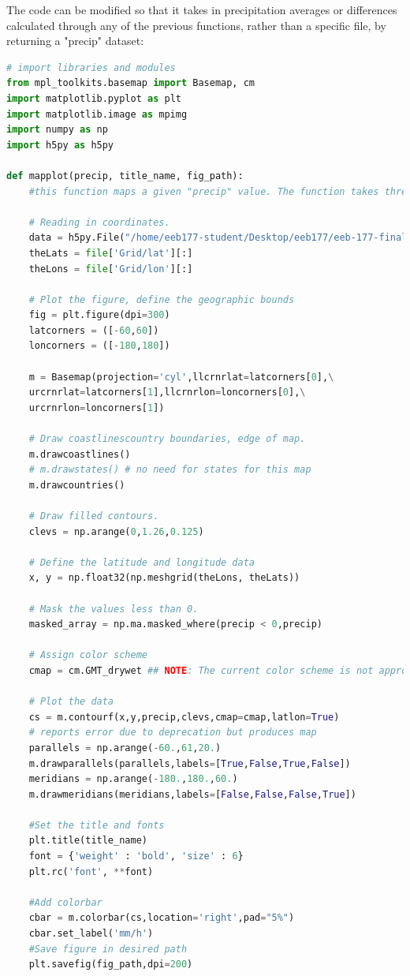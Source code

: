 \documentclass[12pt]{article}
\begin{document}
The code can be modified so that it takes in precipitation averages or differences calculated through any of the previous functions, rather than a specific file, by returning a "precip" dataset:\\
\begin{lstlisting}[language=Python, caption=Mapping precipitation data]
# import libraries and modules
from mpl_toolkits.basemap import Basemap, cm
import matplotlib.pyplot as plt
import matplotlib.image as mpimg
import numpy as np
import h5py as h5py

def mapplot(precip, title_name, fig_path):
    #this function maps a given "precip" value. The function takes three arguments (a dataset called "precip", the desired title for the image, and the path to where the plot should be saved)
    
    # Reading in coordinates.
    data = h5py.File("/home/eeb177-student/Desktop/eeb177/eeb-177-final-project/data/2015/3B-MO.MS.MRG.3IMERG.20151201-S000000-E235959.12.V03D.HDF5", 'r') # Any file can be used as the geography assignment is identical in all files
    theLats = file['Grid/lat'][:]
    theLons = file['Grid/lon'][:]

    # Plot the figure, define the geographic bounds
    fig = plt.figure(dpi=300)
    latcorners = ([-60,60])
    loncorners = ([-180,180])

    m = Basemap(projection='cyl',llcrnrlat=latcorners[0],\
	urcrnrlat=latcorners[1],llcrnrlon=loncorners[0],\
	urcrnrlon=loncorners[1])

    # Draw coastlinescountry boundaries, edge of map.
    m.drawcoastlines()
    # m.drawstates() # no need for states for this map
    m.drawcountries()

    # Draw filled contours.
    clevs = np.arange(0,1.26,0.125)

    # Define the latitude and longitude data
    x, y = np.float32(np.meshgrid(theLons, theLats))

    # Mask the values less than 0.
    masked_array = np.ma.masked_where(precip < 0,precip) 

    # Assign color scheme
    cmap = cm.GMT_drywet ## NOTE: The current color scheme is not appropriate for maps showing anomalies; instead "cmap = plt.cm.RdBu" should be used for any visualization of differences in rainfall.

    # Plot the data
    cs = m.contourf(x,y,precip,clevs,cmap=cmap,latlon=True) 
	# reports error due to deprecation but produces map
    parallels = np.arange(-60.,61,20.)
    m.drawparallels(parallels,labels=[True,False,True,False])
    meridians = np.arange(-180.,180.,60.)
    m.drawmeridians(meridians,labels=[False,False,False,True])

    #Set the title and fonts
    plt.title(title_name)
    font = {'weight' : 'bold', 'size' : 6}
    plt.rc('font', **font)

    #Add colorbar
    cbar = m.colorbar(cs,location='right',pad="5%")
    cbar.set_label('mm/h')
    #Save figure in desired path
    plt.savefig(fig_path,dpi=200) 
\end{lstlisting}
\end{document}
